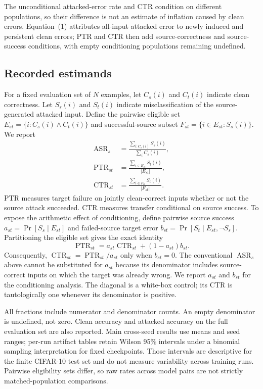 \documentclass[10pt,twocolumn]{article}
\begin{document}
The unconditional attacked-error rate and CTR condition on different populations, so their difference is not an estimate of inflation caused by clean errors. Equation~(1) attributes all-input attacked error to newly induced and persistent clean errors; PTR and CTR then add source-correctness and source-success conditions, with empty conditioning populations remaining undefined.

\subsection{Recorded estimands}
For a fixed evaluation set of $N$ examples, let $C_s(i)$ and $C_t(i)$ indicate clean correctness. Let $S_s(i)$ and $S_t(i)$ indicate misclassification of the source-generated attacked input. Define the pairwise eligible set $E_{st}=\{i:C_s(i)\land C_t(i)\}$ and successful-source subset $F_{st}=\{i\in E_{st}:S_s(i)\}$. We report
\begin{align}
\operatorname{ASR}_s &= \frac{\sum_{i:C_s(i)} S_s(i)}{\sum_i C_s(i)},\\
\operatorname{PTR}_{st} &= \frac{\sum_{i\in E_{st}} S_t(i)}{|E_{st}|},\\
\operatorname{CTR}_{st} &= \frac{\sum_{i\in F_{st}} S_t(i)}{|F_{st}|}.
\end{align}
PTR measures target failure on jointly clean-correct inputs whether or not the source attack succeeded. CTR measures transfer conditional on source success. To expose the arithmetic effect of conditioning, define pairwise source success $a_{st}=\Pr[S_s\mid E_{st}]$ and failed-source target error $b_{st}=\Pr[S_t\mid E_{st},\neg S_s]$. Partitioning the eligible set gives the exact identity
\begin{equation}
\operatorname{PTR}_{st}=a_{st}\operatorname{CTR}_{st}+(1-a_{st})b_{st}.
\end{equation}
Consequently, $\operatorname{CTR}_{st}=\operatorname{PTR}_{st}/a_{st}$ only when $b_{st}=0$. The conventional $\operatorname{ASR}_s$ above cannot be substituted for $a_{st}$ because its denominator includes source-correct inputs on which the target was already wrong. We report $a_{st}$ and $b_{st}$ for the conditioning analysis. The diagonal is a white-box control; its CTR is tautologically one whenever its denominator is positive.

All fractions include numerator and denominator counts. An empty denominator is undefined, not zero. Clean accuracy and attacked accuracy on the full evaluation set are also reported. Main cross-seed results use means and seed ranges; per-run artifact tables retain Wilson 95\% intervals under a binomial sampling interpretation for fixed checkpoints. Those intervals are descriptive for the finite CIFAR-10 test set and do not measure variability across training runs. Pairwise eligibility sets differ, so raw rates across model pairs are not strictly matched-population comparisons.
\end{document}
